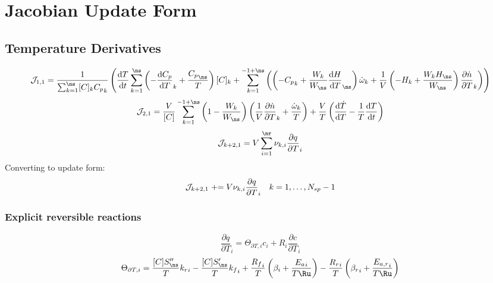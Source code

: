 \documentclass[a4paper,10pt]{article}
\newcommand{\pluseq}{\mathrel{{+}{=}}}
\begin{document}
\section{Jacobian Update Form}
\subsection{Temperature Derivatives}
\begin{dmath} \mathcal{J}_{1,1} = \frac{1}{\sum_{k=1}^{\ns} [C]_{k} {C_p}_{k}} \left(\frac{\text{d} T }{\text{d} t } \sum_{k=1}^{\ns} \left(- \frac{\text{d} {C_p} }{\text{d} T }_{k} + \frac{{C_p}_{\ns}}{T}\right) [C]_{k} + \sum_{k=1}^{-1 + \ns} \left(\left(- {C_p}_{k} + \frac{W_{k}}{W_{\ns}} \frac{\text{d} H }{\text{d} T }_{\ns}\right) \dot{\omega}_{k} + \frac{1}{V} \left(- H_{k} + \frac{W_{k} H_{\ns}}{W_{\ns}}\right) \frac{\partial \dot{n} }{\partial T }_{k}\right)\right)\end{dmath} 
\begin{dmath} \mathcal{J}_{2,1} = \frac{V}{[C]} \sum_{k=1}^{-1 + \ns} \left(1 - \frac{W_{k}}{W_{\ns}}\right) \left(\frac{1}{V} \frac{\partial \dot{n} }{\partial T }_{k} + \frac{\dot{\omega}_{k}}{T}\right) + \frac{V}{T} \left(\frac{\text{d} \dot{T} }{\text{d} T } - \frac{1}{T} \frac{\text{d} T }{\text{d} t }\right)\end{dmath} 
\begin{dmath} \mathcal{J}_{k + 2,1} = V \sum_{i=1}^{\nr} \nu_{k,i} \frac{\partial q }{\partial T }_{i}\end{dmath} 
Converting to update form:
\begin{dmath} \mathcal{J}_{k + 2,1}\pluseq V \nu_{k,i} \frac{\partial q }{\partial T }_{i}\text{\quad} k = 1, \ldots, N_{sp} - 1\end{dmath} 
\subsubsection{Explicit reversible reactions}
\begin{dmath} \frac{\partial q }{\partial T }_{i} = \Theta_{\partial T, i} c_{i} + R_{i} \frac{\partial c }{\partial T }_{i}\end{dmath} 
\begin{dmath} \Theta_{\partial T, i} = \frac{[C] S^{\prime\prime}_{\ns}}{T} {k_r}_{i} - \frac{[C] S^{\prime}_{\ns}}{T} {k_f}_{i} + \frac{{R_f}_{i}}{T} \left(\beta_{i} + \frac{{E_{a}}_{i}}{T \Ru}\right) - \frac{{R_r}_{i}}{T} \left({\beta_r}_{i} + \frac{{E_{a,r}}_{i}}{T \Ru}\right)\end{dmath} 
\end{document}

